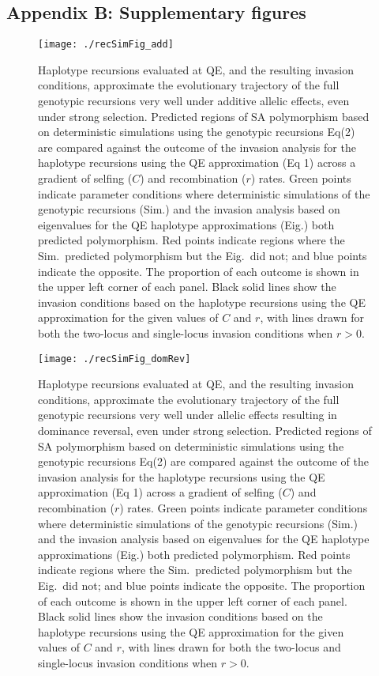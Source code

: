 \documentclass{article}
\begin{document}
\newpage{}

\subsection*{Appendix B: Supplementary figures}
\renewcommand{\theequation}{B\arabic{equation}}
\setcounter{equation}{0}
\renewcommand{\thefigure}{B\arabic{figure}}
\setcounter{figure}{0}

\begin{figure}[h!]
\texttt{[image: ./recSimFig\_add]}
\caption{Haplotype recursions evaluated at QE, and the resulting invasion conditions, approximate the evolutionary trajectory of the full genotypic recursions very well under additive allelic effects, even under strong selection. Predicted regions of SA polymorphism based on deterministic simulations using the genotypic recursions Eq(2) are compared against the outcome of the invasion analysis for the haplotype recursions using the QE approximation (Eq 1) across a gradient of selfing ($C$) and recombination ($r$) rates. Green points indicate parameter conditions where deterministic simulations of the genotypic recursions (Sim.) and the invasion analysis based on eigenvalues for the QE haplotype approximations (Eig.) both predicted polymorphism. Red points indicate regions where the Sim.~predicted polymorphism but the Eig.~did not; and blue points indicate the opposite. The proportion of each outcome is shown in the upper left corner of each panel. Black solid lines show the invasion conditions based on the haplotype recursions using the QE approximation for the given values of $C$ and $r$, with lines drawn for both the two-locus and single-locus invasion conditions when $r > 0$.}
\label{fig:addSim}
\end{figure}
\newpage{}


\begin{figure}[h!] 
\texttt{[image: ./recSimFig\_domRev]}
\caption{Haplotype recursions evaluated at QE, and the resulting invasion conditions, approximate the evolutionary trajectory of the full genotypic recursions very well under allelic effects resulting in dominance reversal, even under strong selection. Predicted regions of SA polymorphism based on deterministic simulations using the genotypic recursions Eq(2) are compared against the outcome of the invasion analysis for the haplotype recursions using the QE approximation (Eq 1) across a gradient of selfing ($C$) and recombination ($r$) rates. Green points indicate parameter conditions where deterministic simulations of the genotypic recursions (Sim.) and the invasion analysis based on eigenvalues for the QE haplotype approximations (Eig.) both predicted polymorphism. Red points indicate regions where the Sim.~predicted polymorphism but the Eig.~did not; and blue points indicate the opposite. The proportion of each outcome is shown in the upper left corner of each panel. Black solid lines show the invasion conditions based on the haplotype recursions using the QE approximation for the given values of $C$ and $r$, with lines drawn for both the two-locus and single-locus invasion conditions when $r > 0$.}
\label{fig:domRevSim}
\end{figure}
\newpage{}
\end{document}
